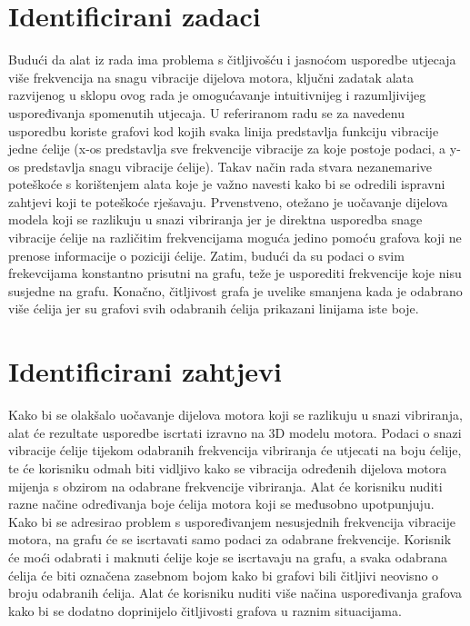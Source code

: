 \documentclass[times, utf8, diplomski]{fer}
\begin{document}
\section{Identificirani zadaci}
Budući da alat iz rada \citep{matkovic2021getting} ima problema s čitljivošću i jasnoćom usporedbe utjecaja više frekvencija na snagu vibracije dijelova motora, ključni zadatak alata razvijenog u sklopu ovog rada je omogućavanje intuitivnijeg i razumljivijeg uspoređivanja spomenutih utjecaja. U referiranom radu se za navedenu usporedbu koriste grafovi kod kojih svaka linija predstavlja funkciju vibracije jedne ćelije (x-os predstavlja sve frekvencije vibracije za koje postoje podaci, a y-os predstavlja snagu vibracije ćelije). Takav način rada stvara nezanemarive poteškoće s korištenjem alata koje je važno navesti kako bi se odredili ispravni zahtjevi koji te poteškoće rješavaju. Prvenstveno, otežano je uočavanje dijelova modela koji se razlikuju u snazi vibriranja jer je direktna usporedba snage vibracije ćelije na različitim frekvencijama moguća jedino pomoću grafova koji ne prenose informacije o poziciji ćelije. Zatim, budući da su podaci o svim frekevcijama konstantno prisutni na grafu, teže je usporediti frekvencije koje nisu susjedne na grafu. Konačno, čitljivost grafa je uvelike smanjena kada je odabrano više ćelija jer su grafovi svih odabranih ćelija prikazani linijama iste boje. 

\section{Identificirani zahtjevi} \label{requests-section}

Kako bi se olakšalo uočavanje dijelova motora koji se razlikuju u snazi vibriranja, alat će rezultate usporedbe iscrtati izravno na 3D modelu motora. Podaci o snazi vibracije ćelije tijekom odabranih frekvencija vibriranja će utjecati na boju ćelije, te će korisniku odmah biti vidljivo kako se vibracija određenih dijelova motora mijenja s obzirom na odabrane frekvencije vibriranja. Alat će korisniku nuditi razne načine određivanja boje ćelija motora koji se međusobno upotpunjuju. Kako bi se adresirao problem s uspoređivanjem nesusjednih frekvencija vibracije motora, na grafu će se iscrtavati samo podaci za odabrane frekvencije. Korisnik će moći odabrati i maknuti ćelije koje se iscrtavaju na grafu, a svaka odabrana ćelija će biti označena zasebnom bojom kako bi grafovi bili čitljivi neovisno o broju odabranih ćelija. Alat će korisniku nuditi više načina uspoređivanja grafova kako bi se dodatno doprinijelo čitljivosti grafova u raznim situacijama.
\end{document}
